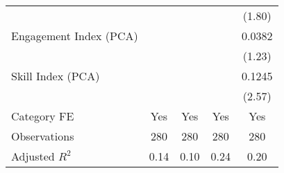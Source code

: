 {\begin{tabular}{l*{4}{c}}
                                   &                   &                   &                   &    (1.80)         \\
[1em]
Engagement Index (PCA)             &                   &                   &                   &    0.0382         \\
                                   &                   &                   &                   &    (1.23)         \\
[1em]
Skill Index (PCA)                  &                   &                   &                   &    0.1245\sym{**} \\
                                   &                   &                   &                   &    (2.57)         \\
[1em]
Category FE                        &       Yes         &       Yes         &       Yes         &       Yes         \\
\hline
Observations                       &       280         &       280         &       280         &       280         \\
Adjusted \(R^{2}\)                 &      0.14         &      0.10         &      0.24         &      0.20         \\
\hline\hline
\end{tabular}
}
